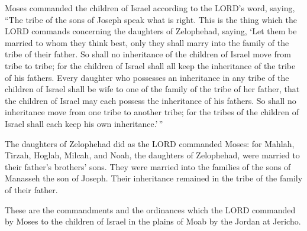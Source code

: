  Moses commanded the children of Israel according to the
LORD's word, saying, ``The tribe of the sons of Joseph speak what is
right.  This is the thing which the LORD commands
concerning the daughters of Zelophehad, saying, `Let them be married to
whom they think best, only they shall marry into the family of the tribe
of their father.  So shall no inheritance of the children
of Israel move from tribe to tribe; for the children of Israel shall all
keep the inheritance of the tribe of his fathers.  Every
daughter who possesses an inheritance in any tribe of the children of
Israel shall be wife to one of the family of the tribe of her father,
that the children of Israel may each possess the inheritance of his
fathers.  So shall no inheritance move from one tribe to
another tribe; for the tribes of the children of Israel shall each keep
his own inheritance.'\,''

 The daughters of Zelophehad did as the LORD commanded
Moses:  for Mahlah, Tirzah, Hoglah, Milcah, and Noah, the
daughters of Zelophehad, were married to their father's brothers' sons.
 They were married into the families of the sons of
Manasseh the son of Joseph. Their inheritance remained in the tribe of
the family of their father.

 These are the commandments and the ordinances which the
LORD commanded by Moses to the children of Israel in the plains of Moab
by the Jordan at Jericho.
